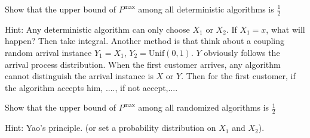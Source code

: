 \begin{exercise}
\label{ex2}	
{\color{red} Show that the upper bound of $P^{\text{max}}$ among all deterministic algorithms is $\frac{1}{2}$}
\end{exercise}

{\color{blue} Hint: Any deterministic algorithm can only choose $X_1$ or $X_2$. If $X_1=x$, what will happen? Then take integral. Another method is that think about a coupling random arrival instance $Y_1=X_1$, $Y_2=\text{Unif}(0,1)$. $Y$ obviously follows the arrival process distribution. When the first customer arrives, any algorithm cannot distinguish the arrival instance is $X$ or $Y$. Then for the first customer, if the algorithm accepts him, ...., if not accept,....}


\begin{exercise}
\label{ex3}
{\color{red}  Show that the upper bound of $P^{\text{max}}$ among all randomized algorithms is $\frac{1}{2}$}
\end{exercise}

{\color{blue} Hint: Yao's principle. (or set a probability distribution on $X_1$ and $X_2$)}.













